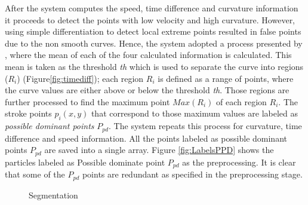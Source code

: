 \documentclass{article}
\begin{document}
After the system computes the speed, time difference and curvature information it proceeds to detect the points with low velocity and high curvature. However, using simple differentiation to detect local extreme points resulted in false points due to the non smooth curves. Hence, the system adopted a process presented by \cite{earlyprocess}, where the mean of each of the four calculated information  is calculated. This mean is taken as the threshold \textit{th} which is used to separate the curve into regions ($R_i$) (Figure\ref{fig:timediff}); each region $R_i$ is defined as a range of points, where the curve values are either above or below the threshold \textit{th}. Those regions are further processed to find the maximum point $Max(R_i)$ of each region $R_i$. The stroke points $p_i(x,y)$ that correspond to those maximum values are labeled as \textit{possible dominant points} $P_{pd}$. The system repeats this process for curvature, time difference and speed information. All the points labeled as possible dominant points $P_{pd}$ are saved into a single array. Figure \ref{fig:LabelsPPD} shows the particles labeled as Possible dominate point $P_{pd}$ as the preprocessing. It is clear that some of the $P_{pd}$ points are redundant as specified in the preprocessing stage. %
\begin{figure}
	\centering
		\hfill
	\caption{Segmentation}%
	\label{fig:pso1}
\end{figure}
\end{document}
